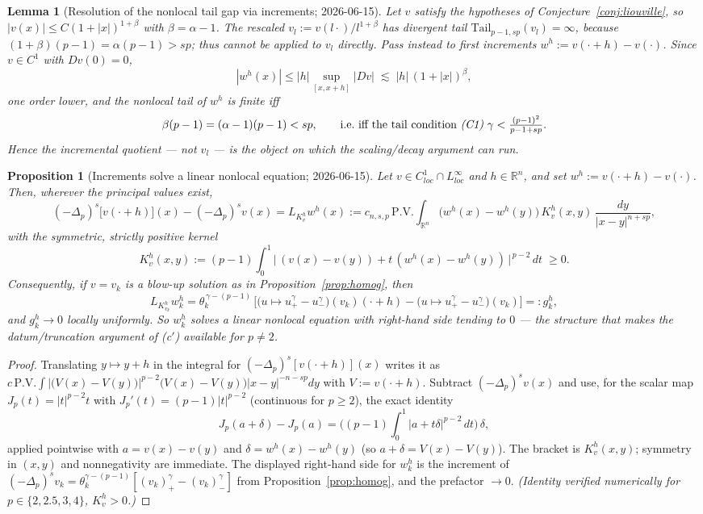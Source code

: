 \documentclass[11pt]{amsart}
\theoremstyle{plain}
\newtheorem{proposition}[theorem]{Proposition}
\newtheorem{lemma}[theorem]{Lemma}
\theoremstyle{definition}
\theoremstyle{remark}
\newcommand{\R}{\mathbb{R}}
\newcommand{\fpl}[1]{(-\Delta_p)^{s}#1}            %
\newcommand{\Jp}[1]{|#1|^{p-2}#1}                  %
\newcommand{\al}{\alpha}
\newcommand{\Tail}{\mathrm{Tail}_{p-1,sp}}
\begin{document}
\begin{lemma}[Resolution of the nonlocal tail gap via increments;
2026-06-15]\label{lem:tailfix}
Let $v$ satisfy the hypotheses of Conjecture~\ref{conj:liouville}, so
$|v(x)|\le C(1+|x|)^{1+\beta}$ with $\beta=\al-1$. The rescaled
$v_l:=v(l\cdot)/l^{1+\beta}$ has \emph{divergent} tail
$\Tail(v_l)=\infty$, because $(1+\beta)(p-1)=\al(p-1)>sp$; thus
\cite{GJS} cannot be applied to $v_l$ directly. Pass instead to first
increments $w^h:=v(\cdot+h)-v(\cdot)$. Since $v\in C^1$ with $Dv(0)=0$,
\[
  |w^h(x)|\le |h|\sup_{[x,x+h]}|Dv|\;\lesssim\;|h|\,(1+|x|)^{\beta},
\]
one order lower, and the nonlocal tail of $w^h$ is finite iff
\[
  \beta(p-1)=(\al-1)(p-1)<sp,
  \qquad\text{i.e.\ iff the tail condition \emph{(C1)}}\
  \gamma<\tfrac{(p-1)^2}{p-1+sp}.
\]
Hence the incremental quotient — not $v_l$ — is the object on which the
scaling/decay argument can run.
\end{lemma}
\begin{proposition}[Increments solve a linear nonlocal equation;
2026-06-15]\label{prop:linincr}
Let $v\in C^1_{loc}\cap L^\infty_{loc}$ and $h\in\R^n$, and set
$w^h:=v(\cdot+h)-v(\cdot)$. Then, wherever the principal values exist,
\[
  \fpl{\big[v(\cdot+h)\big]}(x)-\fpl{v}(x)
  = L_{K_v^h}w^h(x)
  := c_{n,s,p}\,\mathrm{P.V.}\!\int_{\R^n}
     \big(w^h(x)-w^h(y)\big)\,K_v^h(x,y)\,\frac{dy}{|x-y|^{n+sp}},
\]
with the symmetric, \emph{strictly positive} kernel
\[
  K_v^h(x,y):=(p-1)\int_0^1
   \big|\,(v(x)-v(y))+t\,(w^h(x)-w^h(y))\,\big|^{\,p-2}\,dt\;\ge0 .
\]
Consequently, if $v=v_k$ is a blow-up solution as in
Proposition~\ref{prop:homog}, then
\[
  L_{K_{v_k}^h}w_k^h
  = \theta_k^{\,\gamma-(p-1)}\,
    \Big[\big(u\mapsto u_+^\gamma-u_-^\gamma\big)(v_k)(\cdot+h)
         -\big(u\mapsto u_+^\gamma-u_-^\gamma\big)(v_k)\Big]
  =: g_k^h,
\]
and $g_k^h\to0$ locally uniformly. So $w_k^h$ solves a \emph{linear}
nonlocal equation with right-hand side tending to $0$ --- the structure
that makes the datum/truncation argument of \textnormal{(c$'$)} available
for $p\neq2$.
\end{proposition}
\begin{proof}
Translating $y\mapsto y+h$ in the integral for
$\fpl{[v(\cdot+h)]}(x)$ writes it as
$c\,\mathrm{P.V.}\!\int \Jp{\big(V(x)-V(y)\big)}|x-y|^{-n-sp}dy$ with
$V:=v(\cdot+h)$. Subtract $\fpl{v}(x)$ and use, for the scalar map
$J_p(t)=\Jp{t}$ with $J_p'(t)=(p-1)|t|^{p-2}$ (continuous for $p\ge2$),
the exact identity
\[
  J_p(a+\delta)-J_p(a)
  =\Big((p-1)\!\int_0^1|a+t\delta|^{p-2}\,dt\Big)\,\delta,
\]
applied pointwise with $a=v(x)-v(y)$ and
$\delta=w^h(x)-w^h(y)$ (so $a+\delta=V(x)-V(y)$). The bracket is
$K_v^h(x,y)$; symmetry in $(x,y)$ and nonnegativity are immediate. The
displayed right-hand side for $w_k^h$ is the increment of
$\fpl{v_k}=\theta_k^{\gamma-(p-1)}[(v_k)_+^\gamma-(v_k)_-^\gamma]$ from
Proposition~\ref{prop:homog}, and the prefactor $\to0$. \emph{(Identity
verified numerically for $p\in\{2,2.5,3,4\}$, $K_v^h>0$.)}
\end{proof}
\end{document}
